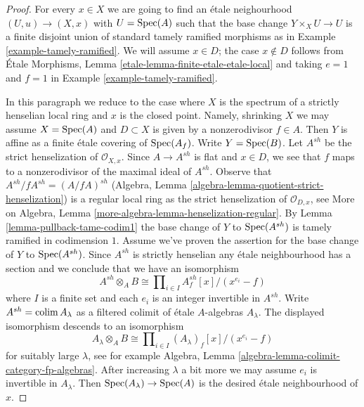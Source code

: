 \begin{proof}
For every $x \in X$ we are going to find an \'etale neighourhood
$(U, u) \to (X, x)$ with $U = \mathop{\mathrm{Spec}}(A)$ such that the base change
$Y \times_X U \to U$ is a finite disjoint union of standard tamely ramified
morphisms as in Example \ref{example-tamely-ramified}.
We will assume $x \in D$; the case $x \not \in D$ follows from
\'Etale Morphisms, Lemma \ref{etale-lemma-finite-etale-etale-local}
and taking $e = 1$ and $f = 1$ in Example \ref{example-tamely-ramified}.

\medskip\noindent
In this paragraph we reduce to the case where $X$ is the spectrum of a
strictly henselian local ring and $x$ is the closed point. Namely, shrinking
$X$ we may assume $X = \mathop{\mathrm{Spec}}(A)$ and $D \subset X$ is given by a
nonzerodivisor $f \in A$. Then $Y$ is affine as a finite
\'etale covering of $\mathop{\mathrm{Spec}}(A_f)$. Write $Y = \mathop{\mathrm{Spec}}(B)$.
Let $A^{sh}$ be the strict henselization of $\mathcal{O}_{X, x}$.
Since $A \to A^{sh}$ is flat and $x \in D$, we see that $f$ maps
to a nonzerodivisor of the maximal ideal of $A^{sh}$.
Observe that $A^{sh}/fA^{sh} = (A/fA)^{sh}$
(Algebra, Lemma \ref{algebra-lemma-quotient-strict-henselization})
is a regular local ring as the strict henselization of $\mathcal{O}_{D, x}$,
see More on Algebra, Lemma \ref{more-algebra-lemma-henselization-regular}.
By Lemma \ref{lemma-pullback-tame-codim1}
the base change of $Y$ to $\mathop{\mathrm{Spec}}(A^{sh})$ is tamely ramified in
codimension $1$. Assume we've proven the assertion for the base change
of $Y$ to $\mathop{\mathrm{Spec}}(A^{sh})$. Since $A^{sh}$ is strictly henselian any
\'etale neighbourhood has a section and we conclude that we have an isomorphism
$$
A^{sh} \otimes_A B \cong
\prod\nolimits_{i \in I} A^{sh}_f[x]/(x^{e_i} - f)
$$
where $I$ is a finite set and each $e_i$ is an integer invertible in $A^{sh}$.
Write $A^{sh} = \mathop{\mathrm{colim}}\nolimits A_\lambda$ as a filtered colimit of \'etale
$A$-algebras $A_\lambda$. The displayed isomorphism
descends to an isomorphism
$$
A_\lambda \otimes_A B \cong \prod\nolimits_{i \in I}
(A_\lambda)_f[x]/(x^{e_i} - f)
$$
for suitably large $\lambda$, see for example
Algebra, Lemma \ref{algebra-lemma-colimit-category-fp-algebras}.
After increasing $\lambda$ a bit
more we may assume $e_i$ is invertible in $A_\lambda$. Then
$\mathop{\mathrm{Spec}}(A_\lambda) \to \mathop{\mathrm{Spec}}(A)$ is the desired \'etale neighbourhood
of $x$.


\end{proof}

